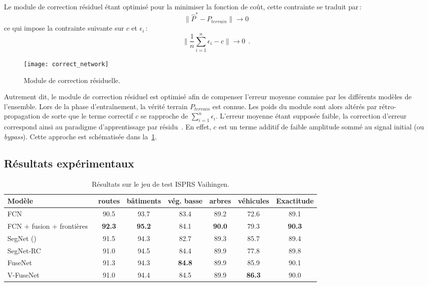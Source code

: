 Le module de correction résiduel étant optimisé pour la minimiser la fonction de coût, cette contrainte se traduit par\,:
\begin{equation}
\lVert \hat{P}^* - P_\mathit{terrain} \rVert \rightarrow 0
\end{equation}
ce qui impose la contrainte suivante sur $c$ et $\epsilon_i$\,:
\begin{equation}
\lVert \frac{1}{n} \sum_{i=1}^n \epsilon_i - c \rVert \rightarrow 0~~.
\end{equation}

\begin{figure}[t]
  \centering
  \texttt{[image: correct\_network]}
  \caption{Module de correction résiduelle.}
  \label{fig:correction_network}
\end{figure}

Autrement dit, le module de correction résiduel est optimisé afin de compenser l'erreur moyenne commise par les différents modèles de l'ensemble. Lors de la phase d'entraînement, la vérité terrain $P_\mathit{terrain}$ est connue. Les poids du module sont alors altérés par rétro-propagation de sorte que le terme correctif $c$ se rapproche de $\sum_{i=1}^n \epsilon_i$. L'erreur moyenne étant supposée faible, la correction d'erreur correspond ainsi au paradigme d'apprentissage par résidu~\cite{he_deep_2016}. En effet, $c$ est un terme additif de faible amplitude sommé au signal initial (ou \emph{bypass}). Cette approche est schématisée dans la~\cref{fig:correction_network}.

\subsection{Résultats expérimentaux}


\begin{table}
    \caption{Résultats sur le jeu de test \gls{ISPRS} Vaihingen.}
    \label{table:final_vaihingen}
    \setlength\tabcolsep{5pt}
	\begin{tabularx}{\textwidth}{Y c c c c c c}
    \toprule
	  Modèle & routes & bâtiments & vég. basse & arbres & véhicules & Exactitude\\
    \midrule
    FCN~\cite{sherrah_fully_2016} & 90.5 & 93.7 & 83.4 & 89.2 & 72.6 & 89.1\\
    FCN + fusion + frontières~\cite{marmanis_classification_2017} & \textbf{92.3} & \textbf{95.2} & 84.1 & \textbf{90.0} & 79.3 & \textbf{90.3}\\
    \midrule
    SegNet () & 91.5 & 94.3 & 82.7 & 89.3 & 85.7 & 89.4\\
	  SegNet-RC & 91.0 & 94.5 & 84.4 & 89.9 & 77.8 & 89.8\\
    FuseNet & 91.3 & 94.3 & \textbf{84.8} & 89.9 & 85.9 & 90.1\\
    V-FuseNet & 91.0 & 94.4 & 84.5 & 89.9 & \textbf{86.3} & 90.0\\
    \bottomrule
    \end{tabularx}
\end{table}

